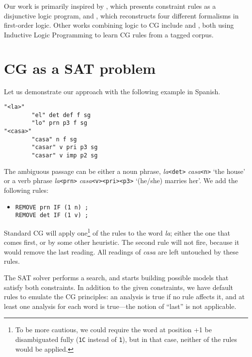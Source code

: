 \documentclass[11pt]{article}
\begin{document}
Our work is primarily inspired by \cite{lager98}, which presents constraint
rules as a disjunctive logic program, and \cite{lager_nivre01}, which
reconstructs four different formalisms in first-order logic.
Other works combining logic to CG include
\cite{lindberg_eineborg98ilp} and \cite{asfrent14}, both using Inductive Logic Programming to learn CG rules from a tagged corpus.


\section{CG as a SAT problem}
Let us demonstrate our approach with the following example in Spanish.

\begin{verbatim}
"<la>"
        "el" det def f sg
        "lo" prn p3 f sg
"<casa>"
        "casa" n f sg
        "casar" v pri p3 sg
        "casar" v imp p2 sg
\end{verbatim}

The ambiguous passage can be either a noun phrase, \emph{la}\texttt{<det>} \emph{casa}\texttt{<n>} 
`the house'  or a verb phrase \emph{la}\texttt{<prn>}  \emph{casa}\texttt{<v><pri><p3>} `(he/she) marries her'. 
We add the following rules:

\begin{itemize}
\item [] \texttt{REMOVE prn IF (1 n) ;} \\
             \texttt{REMOVE det IF (1 v) ;}
\end{itemize}

Standard CG will apply one\footnote{To be more cautious, we could require the word at position +1 be disambiguated fully (\texttt{1C} instead of \texttt{1}), but in that case, 
neither of the rules would be applied.} of the rules to the word \emph{la}; 
either the one that comes first, or by some other heuristic. 
The second rule will not fire, because it would remove the last reading. 
All readings of \emph{casa} are left untouched by these rules.

The SAT solver performs a search, 
and starts building possible models that satisfy both constraints. 
In addition to the given constraints, we have default rules to emulate
the CG principles: an analysis is true if no rule affects it,
and at least one analysis for each word is true---the notion of
``last'' is not applicable.
\end{document}
